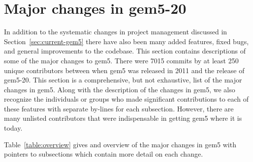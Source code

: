\section{Major changes in gem5-20}
\label{sec:changes}

In addition to the systematic changes in project management discussed in Section~\ref{sec:current-gem5} there have also been many added features, fixed bugs, and general improvements to the codebase.
This section contains descriptions of some of the major changes to gem5.
There were 7015 commits by at least 250 unique contributors between when gem5 was released in 2011 and the release of gem5-20.
This section is a comprehensive, but not exhaustive, list of the major changes in gem5.
Along with the description of the changes in gem5, we also recognize the individuals or groups who made significant contributions to each of these features with separate by-lines for each subsection.
However, there are many unlisted contributors that were indispensable in getting gem5 where it is today.

Table~\ref{table:overview} gives and overview of the major changes in gem5 with pointers to subsections which contain more detail on each change.

